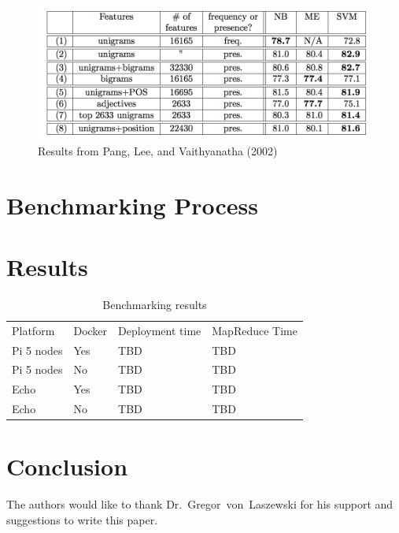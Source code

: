 \begin{figure}[!ht]
	\centering\includegraphics[width=\columnwidth]{images/pang-result.png}
	\caption{Results from Pang, Lee, and Vaithyanatha (2002)
	~\cite{hid-sp18-405-sentiment-pang2002thumbs}}\label{f:pang-result}
\end{figure}

\section{Benchmarking Process}


\section{Results}

\begin{table}[hbt]
\centering
\caption{Benchmarking results}\label{t:results-table}
\begin{tabular}{llll}
Platform    & Docker & Deployment time & MapReduce Time \\
Pi 5 nodes  & Yes    & TBD             & TBD            \\
Pi 5 nodes  & No     & TBD             & TBD            \\
Echo        & Yes    & TBD             & TBD            \\
Echo        & No     & TBD             & TBD            \\
\end{tabular}
\end{table}



\section{Conclusion}



\begin{acks}

  The authors would like to thank Dr.~Gregor~von~Laszewski for his
  support and suggestions to write this paper.

\end{acks}



